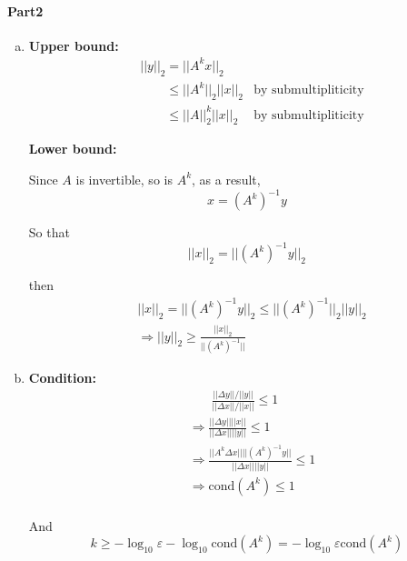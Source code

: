 \documentclass[11pt]{article}
\begin{document}
	\paragraph{Part2}
		\begin{enumerate}[(a)]
			\item 
				\textbf{Upper bound:}
				\begin{align}
					&||y||_2 = ||A^k x||_2\nonumber\\
					&\phantom{||y||_2} \leq ||A^k||_2||x||_2 & \text{by submultipliticity}\nonumber\\
					&\phantom{||y||_2} \leq ||A||^k_2||x||_2 & \text{by submultipliticity}\nonumber
				\end{align}
				
				\textbf{Lower bound:}
				
				Since $A$ is invertible, so is $A^k$, as a result, 
					\[x = (A^k)^{-1}y\]
					
				So that 
					\[||x||_2 = ||(A^k)^{-1}y||_2\]
					
				then
				\begin{align}
					&||x||_2 = ||(A^k)^{-1}y||_2 \leq ||(A^k)^{-1}||_2||y||_2\nonumber\\
					&\Rightarrow ||y||_2 \geq \frac{||x||_2}{||(A^k)^{-1}||}\nonumber
				\end{align}
			\item
				\textbf{Condition:}
				\begin{align}
					&\phantom{\Rightarrow\ }\frac{||\Delta y|| / ||y||}{||\Delta x|| / ||x||} \leq 1\nonumber\\
					&\Rightarrow \frac{||\Delta y|| ||x||}{||\Delta x|| ||y||} \leq 1\nonumber\\
					&\Rightarrow \frac{||A^k\Delta x|| ||(A^k)^{-1}y||}{||\Delta x|| ||y||} \leq 1\nonumber\\
					&\Rightarrow \mathrm{cond}(A^k) \leq 1\nonumber\\
				\end{align}
				
				And
				\[k \geq -\log_{10}{\varepsilon} - \log_{10}{\mathrm{cond}(A^k)} = -\log_{10}\varepsilon \mathrm{cond}(A^k)\]
				
	\end{enumerate}
\end{document}
